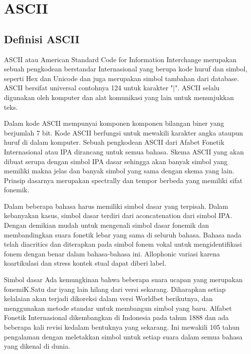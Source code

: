 \section{ASCII}
	\subsection{Definisi ASCII}
	ASCII atau American Standard Code for Information Interchange merupakan sebuah pengkodean berstandar Internasional yang berupa kode huruf dan simbol, seperti Hex dan Unicode dan juga merupakan simbol tambahan dari database. ASCII bersifat universal contohnya 124 untuk karakter "|". ASCII selalu digunakan oleh komputer dan alat komunikasi yang lain untuk menunjukkan teks.
   
    Dalam kode ASCII mempunyai komponen komponen bilangan biner yang berjumlah 7 bit. Kode ASCII berfungsi untuk mewakili karakter angka ataupun huruf di dalam komputer. Sebuah pengkodean ASCII dari Afabet Fonetik Internasional atau IPA dirancang untuk semua bahasa. Skema ASCII yang akan dibuat serupa dengan simbol IPA dasar sehingga akan banyak simbol yang memiliki makna jelas dan banyak simbol yang sama dengan skema yang lain. Prinsip dasarnya merupakan spectrally dan tempor berbeda yang memiliki sifat fonemik.


    Dalam beberapa bahasa harus memiliki simbol dasar yang terpisah. Dalam kebanyakan kasus, simbol dasar terdiri dari aconcatenation dari simbol IPA. Dengan demikian mudah untuk mengenali simbol dasar fonemik
	dan membandingkan suara fonetik lebar yang sama di seluruh bahasa. Bahasa nada telah diacritics dan diterapkan pada simbol fonem vokal untuk mengidentifikasi fonem dengan benar dalam bahasa-bahasa ini. Allophonic variasi karena koartikulasi dan stress kontek stual dapat diberi label.
	

	Simbol dasar Ada kemungkinan bahwa beberapa suara ucapan yang merupakan fonemiK.Satu dar iyang lain hilang dari versi sekarang. Diharapkan setiap kelalaian akan terjadi dikoreksi dalam versi Worldbet berikutnya, dan menggunakan metode standar untuk membangun simbol yang baru. Alfabet Fonetik Internasional dikembangkan di Indonesia pada tahun 1888 dan ada beberapa kali revisi kedalam bentuknya yang sekarang. Ini mewakili 105 tahun pengalaman dengan meletakkan simbol untuk setiap suara dalam semua bahasa yang dikenal di dunia. 
